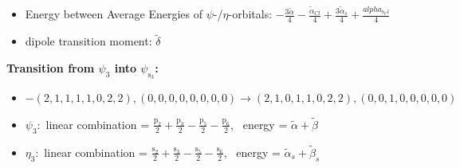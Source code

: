 \documentclass[12pt,a4paper]{article}
\begin{document}
\begin{itemize}
                \item Energy between Average Energies of $\psi$-/$\eta$-orbitals: $- \frac{3 \tilde{\alpha}}{4} - \frac{\tilde{\alpha}_{Cl}}{4} + \frac{3 \tilde{\alpha}_{s}}{4} + \frac{alpha_{\text{s}_Cl}}{4}$
            
            \item dipole transition moment: $\tilde{\delta}$
        
        \end{itemize}
        

        \noindent\textbf{Transition from $\psi_{3}$ into $\psi_{\text{s}_{3}}$:}
        \begin{itemize}
            \item $- (2, 1, 1, 1, 1, 0, 2, 2), (0, 0, 0, 0, 0, 0, 0, 0) \rightarrow (2, 1, 0, 1, 1, 0, 2, 2), (0, 0, 1, 0, 0, 0, 0, 0)$
        
            \item $\psi_{3}:$ linear combination = $\frac{\text{p}_{2}}{2} + \frac{\text{p}_{3}}{2} - \frac{\text{p}_{5}}{2} - \frac{\text{p}_{6}}{2}$, \
            energy = $\tilde{\alpha} + \tilde{\beta}$
            
            \item $\eta_{3}:$ linear combination = $\frac{\text{s}_{2}}{2} + \frac{\text{s}_{3}}{2} - \frac{\text{s}_{5}}{2} - \frac{\text{s}_{6}}{2}$, \
            energy = $\tilde{\alpha}_{s} + \tilde{\beta}_{s}$
            

\end{itemize}
\end{document}
